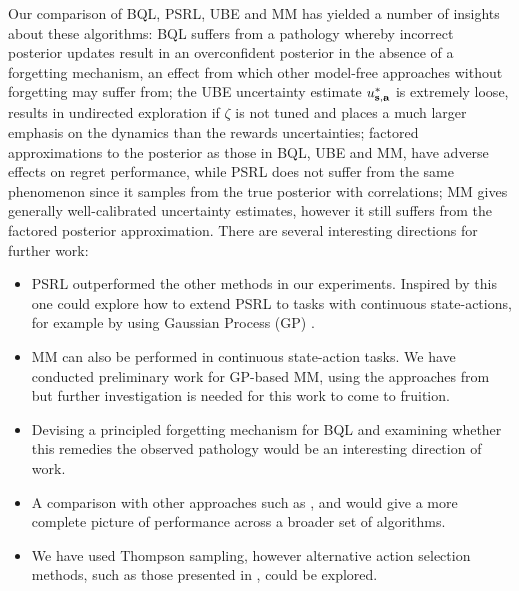 \documentclass{article}
\begin{document}
Our comparison of BQL, PSRL, UBE and MM has yielded a number of insights about these algorithms: BQL suffers from a pathology whereby incorrect posterior updates result in an overconfident posterior in the absence of a forgetting mechanism, an effect from which other model-free approaches without forgetting may suffer from; the UBE uncertainty estimate $u^*_{\mathbf{s}, \mathbf{a}}$ is extremely loose, results in undirected exploration if $\zeta$ is not tuned and places a much larger emphasis on the dynamics than the rewards uncertainties; factored approximations to the posterior as those in BQL, UBE and MM, have adverse effects on regret performance, while PSRL does not suffer from the same phenomenon since it samples from the true posterior with correlations; MM gives generally well-calibrated uncertainty estimates, however it still suffers from the factored posterior approximation. There are several interesting directions for further work:
\begin{itemize}
\item PSRL outperformed the other methods in our experiments. Inspired by this one could explore how to extend PSRL to tasks with continuous state-actions, for example by using Gaussian Process (GP) \cite{gps_textbook}.
\item MM can also be performed in continuous state-action tasks. We have conducted preliminary work for GP-based MM, using the approaches from \cite{gpsinrl, quintechrep} but further investigation is needed for this work to come to fruition.
\item Devising a principled forgetting mechanism for BQL and examining whether this remedies the observed pathology would be an interesting direction of work.
\item A comparison with other approaches such as \cite{bdqn}, \cite{su} and \cite{rlvi} would give a more complete picture of performance across a broader set of algorithms.
\item We have used Thompson sampling, however alternative action selection methods, such as those presented in \cite{bqlearning}, could be explored.
\end{itemize}

\clearpage



\end{document}
